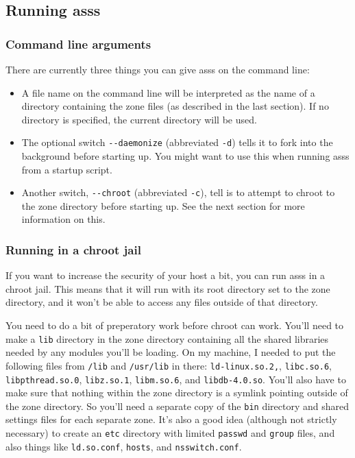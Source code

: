 \documentclass{article}
\newcommand{\asss}{asss}
\begin{document}
\subsection{Running \asss{}}

\subsubsection{Command line arguments}

There are currently three things you can give \asss{} on the command
line:

\begin{itemize}

\item A file name on the command line will be interpreted as the name of
a directory containing the zone files (as described in the last
section). If no directory is specified, the current directory will be
used.

\item The optional switch \verb/--daemonize/ (abbreviated \verb/-d/)
tells it to fork into the background before starting up. You might want
to use this when running \asss{} from a startup script.

\item Another switch, \verb/--chroot/ (abbreviated \verb/-c/), tell is
to attempt to chroot to the zone directory before starting up. See the
next section for more information on this.

\end{itemize}

\subsubsection{Running in a chroot jail}

If you want to increase the security of your host a bit, you can run
\asss{} in a chroot jail. This means that it will run with its root
directory set to the zone directory, and it won't be able to access any
files outside of that directory.

You need to do a bit of preperatory work before chroot can work. You'll
need to make a \verb/lib/ directory in the zone directory containing all
the shared libraries needed by any modules you'll be loading. On my
machine, I needed to put the following files from \verb+/lib+ and
\verb+/usr/lib+ in there:
\verb/ld-linux.so.2,/,
\verb/libc.so.6/,
\verb/libpthread.so.0/,
\verb/libz.so.1/,
\verb/libm.so.6/, and
\verb/libdb-4.0.so/.
You'll also have to make sure that nothing within the zone directory is
a symlink pointing outside of the zone directory. So you'll need a
separate copy of the \verb/bin/ directory and shared settings files for
each separate zone. It's also a good idea (although not strictly
necessary) to create an \verb/etc/ directory with limited \verb/passwd/
and \verb/group/ files, and also things like \verb/ld.so.conf/,
\verb/hosts/, and \verb/nsswitch.conf/.
\end{document}
